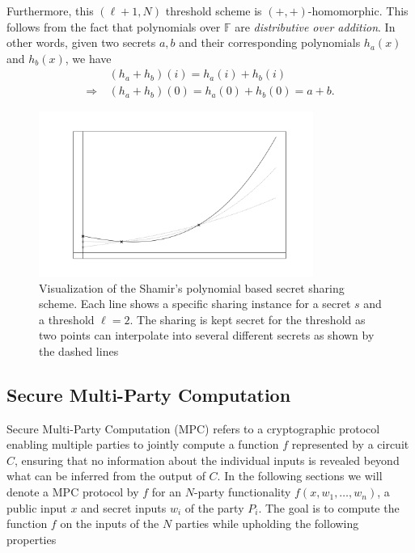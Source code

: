 \documentclass[11pt]{report}
\theoremstyle{definition}
\theoremstyle{plain}
\begin{document}
Furthermore, this $(\ell + 1, N)$ threshold scheme is $(+, +)$-homomorphic. This follows from the fact that polynomials over $\mathbb{F}$ are \textit{distributive over addition}. In other words, given two secrets $a, b$ and their corresponding polynomials $h_a(x)$ and $h_b(x)$, we have
\begin{align*}
                & (h_a + h_b)(i) = h_a(i) + h_b(i)          \\
  \Rightarrow\  & (h_a + h_b)(0) = h_a(0) + h_b(0) = a + b.
\end{align*}

\begin{figure}
  \centering
  \includegraphics[width=0.8\textwidth]{images/shamir.png}
  \caption{Visualization of the Shamir's polynomial based secret sharing scheme. Each line shows a specific sharing instance for a secret $s$ and a threshold $\ell=2$. The sharing is kept secret for the threshold as two points can interpolate into several different secrets as shown by the dashed lines}\label{fig:shamir}
\end{figure}

\subsection{Secure Multi-Party Computation}\label{sec:mpc}

Secure Multi-Party Computation (MPC) refers to a cryptographic protocol enabling multiple parties to jointly compute a function $f$ represented by a circuit $C$, ensuring that no information about the individual inputs is revealed beyond what can be inferred from the output of $C$. In the following sections we will denote a MPC protocol by $f$ for an $N$-party functionality $f(x, w_1, \dots, w_n)$, a public input $x$ and secret inputs $w_i$ of the party $P_i$. The goal is to compute the function $f$ on the inputs of the $N$ parties while upholding the following properties~\cite{cramer2015secure}
\end{document}
